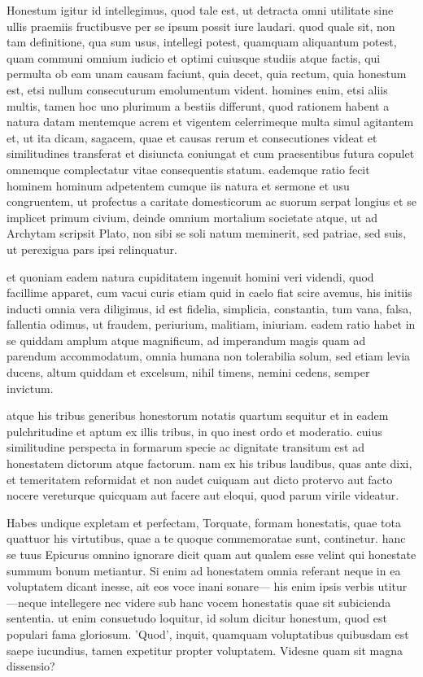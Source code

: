  Honestum igitur id intellegimus, quod tale est, ut detracta omni utilitate sine ullis praemiis fructibusve per se ipsum possit iure laudari. quod quale sit, non tam definitione, qua sum usus, intellegi potest, quamquam aliquantum potest, quam communi omnium iudicio et optimi cuiusque studiis atque factis, qui permulta ob eam unam causam faciunt, quia decet, quia rectum, quia honestum est, etsi nullum consecuturum emolumentum vident. homines enim, etsi aliis multis, tamen hoc uno plurimum a bestiis differunt, quod rationem habent a natura datam mentemque acrem et vigentem celerrimeque multa simul agitantem et, ut ita dicam, sagacem, quae et causas rerum et consecutiones videat et similitudines transferat et disiuncta coniungat et cum praesentibus futura copulet omnemque complectatur vitae consequentis statum. eademque ratio fecit hominem hominum adpetentem cumque iis natura et sermone et usu congruentem, ut profectus a caritate domesticorum ac suorum serpat longius et se implicet primum civium, deinde omnium mortalium societate atque, ut ad Archytam scripsit Plato, non sibi se soli natum meminerit, sed patriae, sed suis, ut perexigua pars ipsi relinquatur.

 et quoniam eadem natura cupiditatem ingenuit homini veri videndi, quod facillime apparet, cum vacui curis etiam quid in caelo fiat scire avemus, his initiis inducti omnia vera diligimus, id est fidelia, simplicia, constantia, tum vana, falsa, fallentia odimus, ut fraudem, periurium, malitiam, iniuriam. eadem ratio habet in se quiddam amplum atque magnificum, ad imperandum magis quam ad parendum accommodatum, omnia humana non tolerabilia solum, sed etiam levia ducens, altum quiddam et excelsum, nihil timens, nemini cedens, semper invictum.

 atque his tribus generibus honestorum notatis quartum sequitur et in eadem pulchritudine et aptum ex illis tribus, in quo inest ordo et moderatio. cuius similitudine perspecta in formarum specie ac dignitate transitum est ad honestatem dictorum atque factorum. nam ex his tribus laudibus, quas ante dixi, et temeritatem reformidat et non audet cuiquam aut dicto protervo aut facto nocere vereturque quicquam aut facere aut eloqui, quod parum virile videatur.

 Habes undique expletam et perfectam, Torquate, formam honestatis, quae tota quattuor his virtutibus, quae a te quoque commemoratae sunt, continetur. hanc se tuus Epicurus omnino ignorare dicit quam aut qualem esse velint qui honestate summum bonum metiantur. Si enim ad honestatem omnia referant neque in ea voluptatem dicant inesse, ait eos voce inani sonare— his enim ipsis verbis utitur—neque intellegere nec videre sub hanc vocem honestatis quae sit subicienda sententia. ut enim consuetudo loquitur, id solum dicitur honestum, quod est populari fama gloriosum. 'Quod', inquit, quamquam voluptatibus quibusdam est saepe iucundius, tamen expetitur propter voluptatem. Videsne quam sit magna dissensio?

